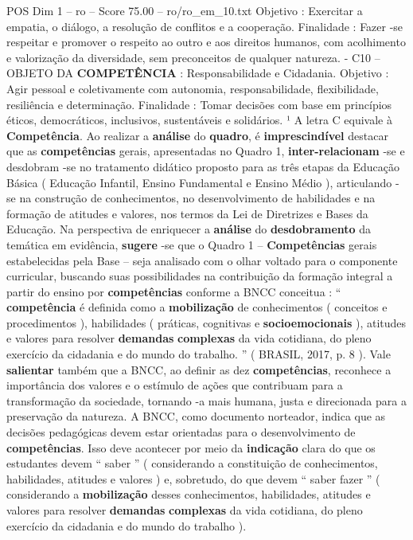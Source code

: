 \begin{textsample}{POS Dim 1 – ro – Score 75.00 – ro/ro\_em\_10.txt}
Objetivo : Exercitar a empatia, o diálogo, a resolução de conflitos e a cooperação.
Finalidade : Fazer -se respeitar e promover o respeito ao outro e aos direitos humanos, com acolhimento e valorização da diversidade, sem preconceitos de qualquer natureza. - C10 – OBJETO DA \textbf{COMPETÊNCIA} : Responsabilidade e Cidadania.
Objetivo : Agir pessoal e coletivamente com autonomia, responsabilidade, flexibilidade, resiliência e determinação.
Finalidade : Tomar decisões com base em princípios éticos, democráticos, inclusivos, sustentáveis e solidários. ¹ A letra C equivale à \textbf{Competência}.
Ao realizar a \textbf{análise} do \textbf{quadro}, é \textbf{imprescindível} destacar que as \textbf{competências} gerais, apresentadas no Quadro 1, \textbf{inter-relacionam} -se e desdobram -se no tratamento didático proposto para as três etapas da Educação Básica ( Educação Infantil, Ensino Fundamental e Ensino Médio ), articulando -se na construção de conhecimentos, no desenvolvimento de habilidades e na formação de atitudes e valores, nos termos da Lei de Diretrizes e Bases da Educação.
Na perspectiva de enriquecer a \textbf{análise} do \textbf{desdobramento} da temática em evidência, \textbf{sugere} -se que o Quadro 1 – \textbf{Competências} gerais estabelecidas pela Base – seja analisado com o olhar voltado para o componente curricular, buscando suas possibilidades na contribuição da formação integral a partir do ensino por \textbf{competências} conforme a BNCC conceitua : “ \textbf{competência} é definida como a \textbf{mobilização} de conhecimentos ( conceitos e procedimentos ), habilidades ( práticas, cognitivas e \textbf{socioemocionais} ), atitudes e valores para resolver \textbf{demandas} \textbf{complexas} da vida cotidiana, do pleno exercício da cidadania e do mundo do trabalho. ” ( BRASIL, 2017, p. 8 ).
Vale \textbf{salientar} também que a BNCC, ao definir as dez \textbf{competências}, reconhece a importância dos valores e o estímulo de ações que contribuam para a transformação da sociedade, tornando -a mais humana, justa e direcionada para a preservação da natureza.
A BNCC, como documento norteador, indica que as decisões pedagógicas devem estar orientadas para o desenvolvimento de \textbf{competências}.
Isso deve acontecer por meio da \textbf{indicação} clara do que os estudantes devem “ saber ” ( considerando a constituição de conhecimentos, habilidades, atitudes e valores ) e, sobretudo, do que devem “ saber fazer ” ( considerando a \textbf{mobilização} desses conhecimentos, habilidades, atitudes e valores para resolver \textbf{demandas} \textbf{complexas} da vida cotidiana, do pleno exercício da cidadania e do mundo do trabalho ).

\end{textsample}
